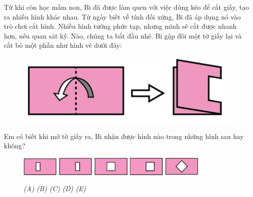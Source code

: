 Từ khi còn học mầm non, Bi  đã được làm quen với việc dùng kéo để cắt giấy, tạo ra nhiều hình khác nhau. Từ ngày biết về tính đối xứng, Bi đã áp dụng nó vào trò chơi cắt hình.
Nhiều hình tưởng phức tạp, nhưng mình sẽ cắt được nhanh hơn, nếu quan sát kỹ.
\vskip 0.1cm
Nào, chúng ta bắt đầu nhé.
\vskip 0.1cm
Bi gập đôi một tờ giấy lại và cắt bỏ một phần như hình vẽ dưới đây: 
	\begin{figure}[H]
		\centering
		\centering
		\vspace*{-10pt}
		\includegraphics[scale=0.4]{cat-1}
		\vspace*{-10pt}
	\end{figure}
Em có biết khi mở tờ giấy ra, Bi nhận được hình nào trong những hình sau hay không?
\begin{figure}[H]
	\centering
	\captionsetup{labelformat=empty}
	\vspace*{-5pt}
	\captionsetup{justification=centering}
	\includegraphics[width =0.16\textwidth]{cat-2a.jpeg}\quad
	\includegraphics[width =0.16\textwidth]{cat-2b.jpeg}\quad
	\includegraphics[width =0.16\textwidth]{cat-2c.jpeg}\quad
	\includegraphics[width =0.16\textwidth]{cat-2d.jpeg}\quad
	\includegraphics[width =0.16\textwidth]{cat-2e}
	\caption{\small\textit{(A) \hspace*{45pt} (B) \hspace*{45pt} (C) \hspace*{45pt} (D) \hspace*{45pt} (E)}}
	\vspace*{-5pt}
\end{figure}

